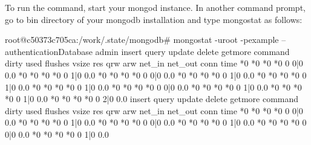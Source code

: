 \documentclass[12pt]{article}
\newcommand{\enlargepage}{%
\addtolength{\topmargin}{-2.2cm}
\addtolength{\textheight}{4.4cm}
}
\newcommand{\restorepage}{%
\addtolength{\topmargin}{2.2cm}
\addtolength{\textheight}{-4.4cm}
}
\begin{document}
\begin{bashcode}
\begin{bashcode}
To run the command, start your mongod instance. In another command
prompt, go to bin directory of your mongodb installation and type
mongostat as follows:

\pagebreak

\enlargepage
\begin{landscape}
\thispagestyle{empty}
\begin{bashcode}
root@c50373c705ca:/work/.state/mongodb# mongostat -uroot -pexample --authenticationDatabase admin
insert query update delete getmore command dirty used flushes vsize  res qrw arw net_in net_out conn                time
    *0    *0     *0     *0       0     0|0  0.0%
    *0    *0     *0     *0       0     1|0  0.0%
    *0    *0     *0     *0       0     0|0  0.0%
    *0    *0     *0     *0       0     1|0  0.0%
    *0    *0     *0     *0       0     1|0  0.0%
    *0    *0     *0     *0       0     1|0  0.0%
    *0    *0     *0     *0       0     0|0  0.0%
    *0    *0     *0     *0       0     1|0  0.0%
    *0    *0     *0     *0       0     1|0  0.0%
    *0    *0     *0     *0       0     2|0  0.0%
insert query update delete getmore command dirty used flushes vsize  res qrw arw net_in net_out conn                time
    *0    *0     *0     *0       0     0|0  0.0%
    *0    *0     *0     *0       0     1|0  0.0%
    *0    *0     *0     *0       0     0|0  0.0%
    *0    *0     *0     *0       0     1|0  0.0%
    *0    *0     *0     *0       0     0|0  0.0%
    *0    *0     *0     *0       0     1|0  0.0%
\end{bashcode}
\end{landscape}
\restorepage


\end{bashcode}
\end{bashcode}
\end{document}

